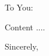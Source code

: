 \documentclass[a4paper]{letter}
\begin{document}
\begin{letter}
    {}

\opening{To You:}

Content ....

\closing{Sincerely,}
\end{letter}
\end{document}
